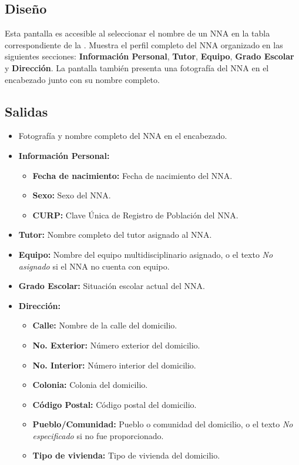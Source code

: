 \subsection{Diseño}
Esta pantalla  es accesible al 
seleccionar el nombre de un NNA en la tabla correspondiente de la 
. Muestra el perfil completo 
del NNA organizado en las siguientes secciones: \textbf{Información Personal}, 
\textbf{Tutor}, \textbf{Equipo}, \textbf{Grado Escolar} y \textbf{Dirección}. 
La pantalla también presenta una fotografía del NNA en el encabezado junto con 
su nombre completo.


\subsection{Salidas}
\begin{itemize}
	\item Fotografía y nombre completo del NNA en el encabezado.
	\item \textbf{Información Personal:}
	\begin{itemize}
		\item \textbf{Fecha de nacimiento:} Fecha de nacimiento del NNA.
		\item \textbf{Sexo:} Sexo del NNA.
		\item \textbf{CURP:} Clave Única de Registro de Población del NNA.
	\end{itemize}
	\item \textbf{Tutor:} Nombre completo del tutor asignado al NNA.
	\item \textbf{Equipo:} Nombre del equipo multidisciplinario asignado, o el 
	texto \textit{No asignado} si el NNA no cuenta con equipo.
	\item \textbf{Grado Escolar:} Situación escolar actual del NNA.
	\item \textbf{Dirección:}
	\begin{itemize}
		\item \textbf{Calle:} Nombre de la calle del domicilio.
		\item \textbf{No. Exterior:} Número exterior del domicilio.
		\item \textbf{No. Interior:} Número interior del domicilio.
		\item \textbf{Colonia:} Colonia del domicilio.
		\item \textbf{Código Postal:} Código postal del domicilio.
		\item \textbf{Pueblo/Comunidad:} Pueblo o comunidad del domicilio, o el 
		texto \textit{No especificado} si no fue proporcionado.
		\item \textbf{Tipo de vivienda:} Tipo de vivienda del domicilio.
	\end{itemize}
\end{itemize}

